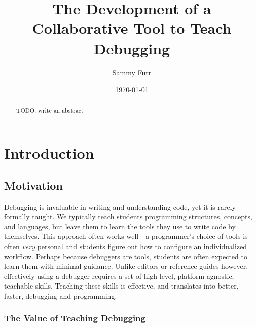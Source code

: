 \documentclass[12pt]{article}
\author{Sammy Furr}
\title{The Development of a Collaborative Tool to Teach Debugging}
\date{\today}
\begin{document}
\begin{titlepage}
\maketitle
\end{titlepage}

\begin{abstract}
TODO: write an abstract
\end{abstract}

\tableofcontents
\pagebreak

\section{Introduction}
\subsection{Motivation}

Debugging is invaluable in writing and understanding code, yet it is
rarely formally taught\cite{doi:10.1080/08993400802114581}.  We
typically teach students programming structures, concepts, and
languages, but leave them to learn the tools they use to write code by
themselves.  This approach often works well---a programmer's choice of
tools is often \textit{very} personal and students figure out how to
configure an individualized workflow.  Perhaps because debuggers are
tools, students are often expected to learn them with minimal
guidance.  Unlike editors or reference guides however, effectively
using a debugger requires a set of high-level, platform agnostic,
teachable skills.  Teaching these skills is effective, and translates
into better, faster, debugging and
programming\cite{10.1145/3286960.3286970}\cite{10.1145/3361721.3361724}.

\subsubsection{The Value of Teaching Debugging}
\end{document}
